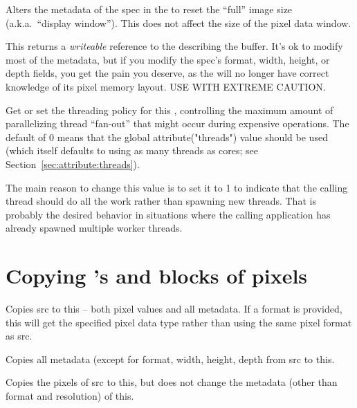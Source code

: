 Alters the metadata of the spec in the \ImageBuf to reset the ``full''
image size (a.k.a.\ ``display window'').  This does not affect the size
of the pixel data window.
\apiend

This returns a \emph{writeable} reference to the \ImageSpec describing
the buffer.  It's ok to modify most of the metadata, but if you modify
the spec's {\cf format}, {\cf width}, {\cf height}, or {\cf depth}
fields, you get the pain you deserve, as the \ImageBuf will no longer
have correct knowledge of its pixel memory layout.  USE WITH EXTREME
CAUTION.
\apiend

Get or set the threading policy for this \ImageBuf, controlling the
maximum amount of parallelizing thread ``fan-out'' that might occur during
expensive operations. The default of 0 means that the global
{\cf attribute("threads")} value should be used (which itself defaults to
using as many threads as cores; see Section~\ref{sec:attribute:threads}).

The main reason to change this value is to set it to 1 to indicate that the
calling thread should do all the work rather than spawning new threads. That
is probably the desired behavior in situations where the calling application
has already spawned multiple worker threads.
\apiend


\section{Copying \ImageBuf's and blocks of pixels}

Copies {\cf src} to {\cf this} -- both pixel values and all metadata.
If a {\cf format} is provided, {\cf this} will get the specified pixel
data type rather than using the same pixel format as {\cf src}.
\apiend

Copies all metadata (except for {\cf format}, {\cf width}, {\cf height},
{\cf depth} from {\cf src} to {\cf this}.
\apiend

Copies the pixels of {\cf src} to {\cf this}, but does not change the
metadata (other than format and resolution) of {\cf this}.
\apiend


